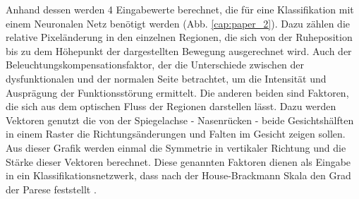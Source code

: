Anhand dessen werden 4 Eingabewerte berechnet, die für eine Klassifikation mit einem Neuronalen Netz benötigt werden (Abb. \ref{cap:paper_2}). Dazu zählen die relative Pixeländerung in den einzelnen Regionen, die sich von der Ruheposition bis zu dem Höhepunkt der dargestellten Bewegung ausgerechnet wird. Auch der Beleuchtungskompensationsfaktor, der die Unterschiede zwischen der dysfunktionalen und der normalen Seite betrachtet, um die Intensität und Ausprägung der Funktionsstörung ermittelt. Die anderen beiden sind Faktoren, die sich aus dem optischen Fluss der Regionen darstellen lässt. Dazu werden Vektoren genutzt die von der Spiegelachse - Nasenrücken - beide Gesichtshälften in einem Raster die Richtungsänderungen und Falten im Gesicht zeigen sollen. Aus dieser Grafik werden einmal die Symmetrie in vertikaler Richtung und die Stärke dieser Vektoren berechnet. Diese genannten Faktoren dienen als Eingabe in ein Klassifikationsnetzwerk, dass nach der House-Brackmann Skala den Grad der Parese feststellt \cite{detection_fp1}.
